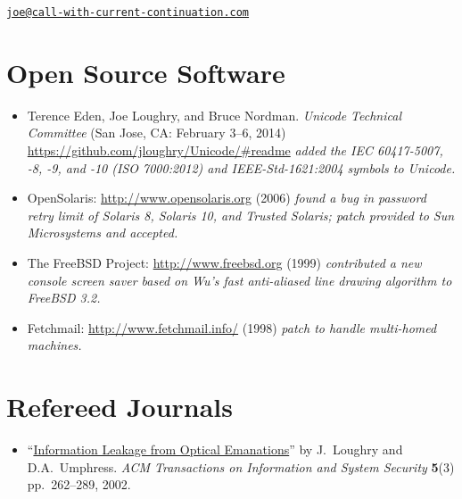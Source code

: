 \documentclass[12pt,twoside,letterpaper]{article}
\begin{document}
\newpage


\vspace*{-23mm}\hfill\href{mailto:joe@call-with-current-continuation.com}%
{\nolinkurl{joe@call-with-current-continuation.com}}

\vspace{-10mm}
\section*{Open Source Software}
\vspace{-2mm}

\begin{itemize}
	\item Terence Eden, Joe Loughry, and Bruce Nordman. \emph{Unicode
		Technical Committee} (San Jose, CA: February 3--6, 2014)
		\url{https://github.com/jloughry/Unicode/#readme} \emph{added
		the IEC 60417-5007, -8, -9, and -10 (ISO 7000:2012) and
		IEEE-Std-1621:2004 symbols to Unicode.}\vspace{-1mm}
	\item OpenSolaris: \url{http://www.opensolaris.org} (2006)
		\emph{found a bug in password retry limit of Solaris 8, Solaris 10,
		and Trusted Solaris; patch provided to Sun Microsystems and accepted.}\vspace{-1mm}
	\item The FreeBSD Project: \url{http://www.freebsd.org} (1999)
		\emph{contributed a new console screen saver based on Wu's fast
		anti-aliased line drawing algorithm to FreeBSD 3.2.}\vspace{-1mm}
	\item Fetchmail: \url{http://www.fetchmail.info/} (1998)
		\emph{patch to handle multi-homed machines.}
\end{itemize}

\vspace{-7mm}
\section*{Refereed Journals}
\vspace{-2mm}

\begin{itemize}
	\item ``\href{http://dl.acm.org/citation.cfm?doid=545186.545189}{Information
		Leakage from Optical Emanations}'' by J.\ Loughry and D.A.\ Umphress.
		\emph{ACM Transactions on Information and System Security} \textbf{5}(3)
		pp.\ 262--289, 2002.
\end{itemize}
\end{document}
